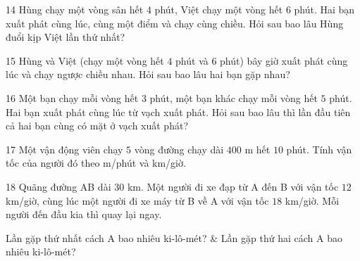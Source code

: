 \gap
\begin{probbox}{14}{\relax}
Hùng chạy một vòng sân hết $4$ phút, Việt chạy một vòng hết $6$ phút. Hai bạn xuất phát cùng lúc, cùng một điểm và chạy cùng chiều. Hỏi sau bao lâu Hùng đuổi kịp Việt lần thứ nhất?
\end{probbox}
\gap
\begin{probbox}{15}{\relax}
Hùng và Việt (chạy một vòng hết $4$ phút và $6$ phút) bây giờ xuất phát cùng lúc và chạy ngược chiều nhau. Hỏi sau bao lâu hai bạn gặp nhau?
\end{probbox}
\gap
\begin{probbox}{16}{\relax}
Một bạn chạy mỗi vòng hết $3$ phút, một bạn khác chạy mỗi vòng hết $5$ phút. Hai bạn xuất phát cùng lúc từ vạch xuất phát. Hỏi sau bao lâu thì lần đầu tiên cả hai bạn cùng có mặt ở vạch xuất phát?
\end{probbox}
\gap
\begin{probbox}{17}{\relax}
Một vận động viên chạy $5$ vòng đường chạy dài $400$ m hết $10$ phút. Tính vận tốc của người đó theo m/phút và km/giờ.
\end{probbox}
\gap
\begin{probbox}{18}{\relax}
Quãng đường AB dài $30$ km. Một người đi xe đạp từ A đến B với vận tốc $12$ km/giờ, cùng lúc một người đi xe máy từ B về A với vận tốc $18$ km/giờ. Mỗi người đến đầu kia thì quay lại ngay.
\begin{cols2}
 Lần gặp thứ nhất cách A bao nhiêu ki-lô-mét? &  Lần gặp thứ hai cách A bao nhiêu ki-lô-mét?
\end{cols2}
\end{probbox}
